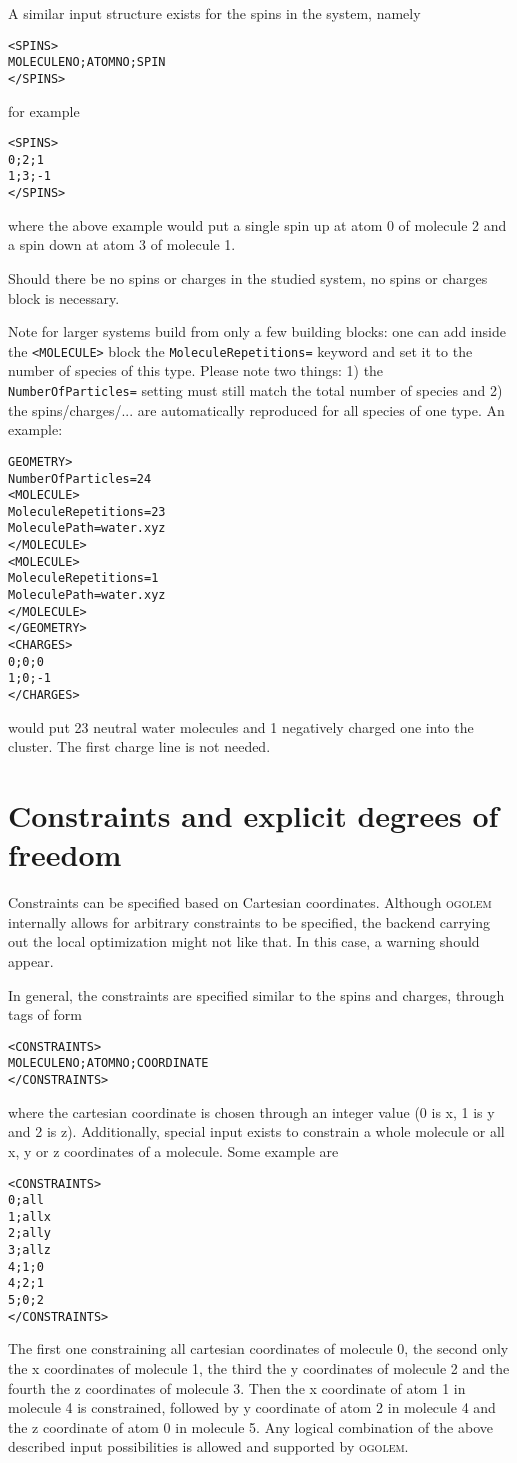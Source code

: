 \documentclass[a4paper,10pt]{scrbook}
\newcommand{\ogo}{\textsc{ogolem}}
\begin{document}
A similar input structure exists for the spins in the system, namely
\begin{verbatim}
<SPINS>
MOLECULENO;ATOMNO;SPIN
</SPINS>
\end{verbatim}
for example
\begin{verbatim}
<SPINS>
0;2;1
1;3;-1
</SPINS>
\end{verbatim}
where the above example would put a single spin up at atom 0 of molecule 2 and a
spin down at atom 3 of molecule 1.

Should there be no spins or charges in the studied system, no spins or charges
block is necessary.

Note for larger systems build from only a few building blocks: one can add
inside the \texttt{<MOLECULE>} block the \texttt{MoleculeRepetitions=} keyword
and set it to the number of species of this type. Please note two things: 1) the
\texttt{NumberOfParticles=} setting must still match the total number of species
and 2) the spins/charges/... are automatically reproduced for all species of one
type. An example:

\begin{verbatim}
GEOMETRY>
NumberOfParticles=24
<MOLECULE>
MoleculeRepetitions=23
MoleculePath=water.xyz
</MOLECULE>
<MOLECULE>
MoleculeRepetitions=1
MoleculePath=water.xyz
</MOLECULE>
</GEOMETRY>
<CHARGES>
0;0;0
1;0;-1
</CHARGES>
\end{verbatim}
would put 23 neutral water molecules and 1 negatively charged one into the
cluster. The first charge line is not needed.

\section{Constraints and explicit degrees of freedom}
Constraints can be specified based on Cartesian coordinates. Although \ogo{}
internally allows for arbitrary constraints to be specified, the backend
carrying out the local optimization might not like that. In this case, a
warning should appear.

In general, the constraints are specified similar to the spins and charges,
through tags of form
\begin{verbatim}
<CONSTRAINTS>
MOLECULENO;ATOMNO;COORDINATE
</CONSTRAINTS>
\end{verbatim}
where the cartesian coordinate is chosen through an integer value (0 is x, 1 is
y and 2 is z). Additionally, special input exists to constrain a whole
molecule or all x, y or z coordinates of a molecule. Some example are
\begin{verbatim}
<CONSTRAINTS>
0;all
1;allx
2;ally
3;allz
4;1;0
4;2;1
5;0;2
</CONSTRAINTS>
\end{verbatim}
The first one constraining all cartesian coordinates of molecule 0, the second
only the x coordinates of molecule 1, the third the y coordinates of molecule 2
and the fourth the z coordinates of molecule 3. Then the x coordinate of atom 1
in molecule 4 is constrained, followed by y coordinate of atom 2 in molecule 4
and the z coordinate of atom 0 in molecule 5. Any logical combination of the
above described input possibilities is allowed and supported by \ogo{}.
\end{document}
